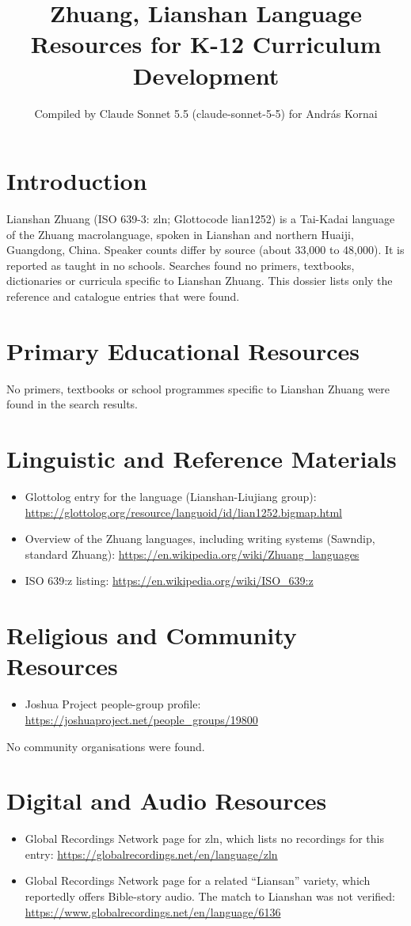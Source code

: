 \documentclass[12pt]{article}
\title{Zhuang, Lianshan Language Resources for K-12 Curriculum Development}
\author{Compiled by Claude Sonnet 5.5 (claude-sonnet-5-5) for Andr\'as Kornai}
\date{}
\begin{document}
\maketitle

\section{Introduction}
Lianshan Zhuang (ISO 639-3: zln; Glottocode lian1252) is a Tai-Kadai language of the Zhuang macrolanguage, spoken in Lianshan and northern Huaiji, Guangdong, China. Speaker counts differ by source (about 33,000 to 48,000). It is reported as taught in no schools. Searches found no primers, textbooks, dictionaries or curricula specific to Lianshan Zhuang. This dossier lists only the reference and catalogue entries that were found.

\section{Primary Educational Resources}
No primers, textbooks or school programmes specific to Lianshan Zhuang were found in the search results.

\section{Linguistic and Reference Materials}
\begin{itemize}
\item Glottolog entry for the language (Lianshan-Liujiang group): \url{https://glottolog.org/resource/languoid/id/lian1252.bigmap.html}
\item Overview of the Zhuang languages, including writing systems (Sawndip, standard Zhuang): \url{https://en.wikipedia.org/wiki/Zhuang_languages}
\item ISO 639:z listing: \url{https://en.wikipedia.org/wiki/ISO_639:z}
\end{itemize}

\section{Religious and Community Resources}
\begin{itemize}
\item Joshua Project people-group profile: \url{https://joshuaproject.net/people_groups/19800}
\end{itemize}
No community organisations were found.

\section{Digital and Audio Resources}
\begin{itemize}
\item Global Recordings Network page for zln, which lists no recordings for this entry: \url{https://globalrecordings.net/en/language/zln}
\item Global Recordings Network page for a related ``Liansan'' variety, which reportedly offers Bible-story audio. The match to Lianshan was not verified: \url{https://www.globalrecordings.net/en/language/6136}
\end{itemize}
\end{document}
